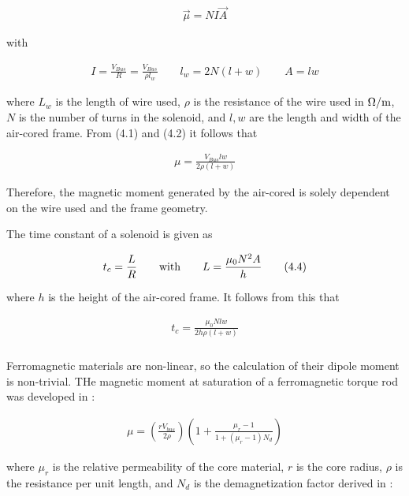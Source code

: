 \documentclass{article}
\begin{document}
\begin{align}
    \vec{\mu} = NI \vec{A} \tag{4.1}
\end{align}

\noindent with

\begin{align}
   I = \frac{V_{Bus}}{R} = \frac{V_{Bus}}{\rho l_{w}} \qquad l_{w} = 2N(l+w) \tag{4.2} \qquad A = lw
\end{align}

\noindent where $L_{w}$ is the length of wire used, $\rho$ is the resistance of the wire used in $\Omega/\textup{m}$, $N$ is the number of turns in the solenoid, and $l,w$ are the length and width of the air-cored frame. From (4.1) and (4.2) it follows that 

\begin{align}
    \mu = \frac{V_{Bus} l w}{2 \rho (l+w)} \tag{4.3}
\end{align}

\noindent Therefore, the magnetic moment generated by the air-cored is solely dependent on the wire used and the frame geometry. 

The time constant of a solenoid is given as

\begin{align}
    t_{c} = \frac{L}{R} \qquad \textup{with} \qquad L = \frac{\mu_{0} N^2 A}{h} \tag{4.4}
\end{align}

\noindent where $h$ is the height of the air-cored frame. It follows from this that

\begin{align}
     t_{c} = \frac{\mu_{0} N l w}{2 h \rho (l+w)} \tag{4.5}
\end{align}

\subsubsection{\color{black}{Ferromagnetic-Cored Magnetorquers}}

Ferromagnetic materials are non-linear, so the calculation of their dipole moment is non-trivial. THe magnetic moment at saturation of a ferromagnetic torque rod was developed in \cite{mehrjardi3}:

\begin{align}
    \mu = \left( \frac{r V_{bus}}{2 \rho} \right) \left( 1 + \frac{\mu_{r} - 1}{1 + (\mu_{r}-1) N_{d}} \right) \tag{4.6}
\end{align}

\noindent where $\mu_{r}$ is the relative permeability of the core material, $r$ is the core radius, $\rho$ is the resistance per unit length, and $N_{d}$ is the demagnetization factor derived in \cite{mehrjardi2}:
\end{document}
